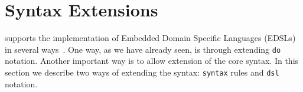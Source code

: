 \section{Syntax Extensions}

\Idris{} supports the implementation of Embedded Domain Specific Languages (EDSLs) in several ways~\cite{res-dsl-padl12}.
One way, as we have already seen, is through extending \texttt{do} notation.
Another important way is to allow extension of the core syntax.
In this section we describe two ways of extending the syntax: \texttt{syntax} rules and \texttt{dsl} notation.




